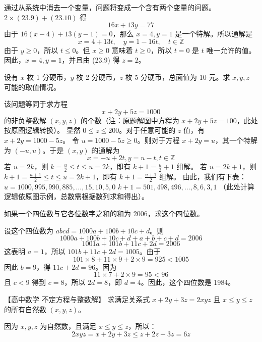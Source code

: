 \begin{questions}
\begin{solution}
通过从系统中消去一个变量，问题将变成一个含有两个变量的问题。$2 \times (23.9) + (23.10)$ 得
\[
16x + 13y = 77
\]
由于 $16(x - 4) + 13(y - 1) = 0$，那么 $x = 4, y = 1$ 是一个特解。所以通解是
\[
x = 4 + 13t, \quad y = 1 - 16t, \quad t \in \mathbb{Z}
\]
由于 $y \ge 0$，所以 $t \le 0$。但 $x \ge 0$ 意味着 $t \ge 0$，所以 $t = 0$ 是 $t$ 唯一允许的值。因此，$x = 4, y = 1$，并且由 (23.9) 得 $z = 2$。
\end{solution}

\question 设有 $x$ 枚 1 分硬币，$y$ 枚 2 分硬币，$z$ 枚 5 分硬币，总面值为 10 元。求 $x, y, z$ 可能的取值情况。

\begin{solution}
该问题等同于求方程
\[
x + 2y + 5z = 1000
\]
的非负整数解 $(x, y, z)$ 的个数（注：原题解图中方程为 $x + 2y + 5z = 100$，此处按原图逻辑转换）。
显然 $0 \le z \le 200$。对于任意可能的 $z$ 值，有 $x + 2y = 1000 - 5z$。
令 $u = 1000 - 5z \ge 0$。则对于方程 $x + 2y = u$，其一个特解为 $(-u, u)$。于是 $(x, y)$ 的通解为
\[
x = -u + 2t, y = u - t, t \in \mathbb{Z}
\]
若 $u = 2k$，则 $k = \frac{u}{2} \le t \le u = 2k$，即有 $k + 1 = \frac{u}{2} + 1$ 组解。
若 $u = 2k + 1$，则 $k + 1 = \frac{u+1}{2} \le t \le u = 2k + 1$，即有 $k + 1 = \frac{u + 1}{2}$ 组解。
由此，我们有下表：
$u = 1000, 995, 990, 885, \dots, 15, 10, 5, 0$
$k + 1 = 501, 498, 496, \dots, 8, 6, 3, 1$
（此处计算逻辑依原图示例，总数需根据数列求和得出）。
\end{solution}

\question 如果一个四位数与它各位数字之和的和为 2006，求这个四位数。

\begin{solution}
设这个四位数为 $abcd = 1000a + 100b + 10c + d$。则
\[
1000a + 100b + 10c + d + a + b + c + d = 2006
\]
\[
1001a + 101b + 11c + 2d = 2006
\]
这表明 $a = 1$，所以 $101b + 11c + 2d = 1005$。由于
\[
101 \times 8 + 11 \times 9 + 2 \times 9 = 925 < 1005
\]
因此 $b = 9$，得 $11c + 2d = 96$。因为
\[
11 \times 7 + 2 \times 9 = 95 < 96
\]
且 $c < 9$ 得到 $c = 8$，所以 $2d = 8$，即 $d = 4$。因此，这个四位数是 1984。
\end{solution}

\question
【高中数学 不定方程与整数解】
求满足关系式 $x + 2y + 3z = 2xyz$ 且 $x \le y \le z$ 的所有自然数 $(x, y, z)$。

\begin{solution}
因为 $x, y, z$ 为自然数，且满足 $x \le y \le z$，所以：
\[
2xyz = x + 2y + 3z \le z + 2z + 3z = 6z
\]


\end{solution}
\end{questions}
